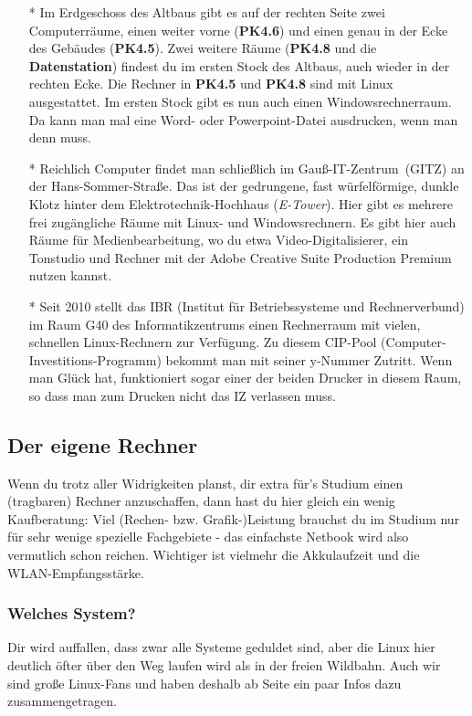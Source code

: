 			\begin{itemize}
				\item[*] Im Erdgeschoss des Altbaus gibt es auf der rechten Seite zwei Computerräume, einen weiter vorne (\textbf{PK4.6}) und einen genau in der Ecke des Gebäudes (\textbf{PK4.5}). Zwei weitere Räume (\textbf{PK4.8} und die \textbf{Datenstation}) findest du im ersten Stock des Altbaus, auch wieder in der rechten Ecke. Die Rechner in \textbf{PK4.5} und \textbf{PK4.8} sind mit Linux ausgestattet. Im ersten Stock gibt es nun auch einen Windowsrechnerraum. Da kann man mal eine Word- oder Powerpoint-Datei ausdrucken, wenn man denn muss.

				\item[*] Reichlich Computer findet man schließlich im Gauß-IT-Zentrum~(GITZ) an der Hans-Sommer-Straße. Das ist der gedrungene, fast würfelförmige, dunkle Klotz hinter dem Elektrotechnik-Hochhaus (\emph{E-Tower}). Hier gibt es mehrere frei zugängliche Räume mit  Linux- und Windowsrechnern. Es gibt hier auch Räume für Medienbearbeitung, wo du etwa Video-Digitalisierer, ein Tonstudio und Rechner mit der Adobe Creative Suite Production Premium nutzen kannst.

				\item[*] Seit 2010 stellt das IBR (Institut für Betriebssysteme und Rechnerverbund) im Raum G40 des Informatikzentrums einen Rechnerraum mit vielen, schnellen Linux-Rechnern  zur Verfügung. Zu diesem CIP-Pool (Computer-Investitions-Programm) bekommt man mit seiner y-Nummer Zutritt. Wenn man Glück hat, funktioniert sogar einer der beiden Drucker in diesem Raum, so dass man zum Drucken nicht das IZ verlassen muss.
			\end{itemize}

		\subsection{Der eigene Rechner}
			Wenn du trotz aller Widrigkeiten planst, dir
			extra für's Studium einen (tragbaren) Rechner
			anzuschaffen, dann hast du hier gleich ein wenig
			Kaufberatung: Viel (Rechen- bzw.
			Grafik-)Leistung brauchst du im Studium  nur für
			sehr wenige spezielle Fachgebiete - das
			einfachste Netbook wird also vermutlich schon
			reichen. Wichtiger ist vielmehr die Akkulaufzeit
			und die WLAN-Empfangsstärke. %

		\subsubsection{Welches System?}
			Dir wird auffallen, dass zwar alle Systeme geduldet sind, aber die Linux hier deutlich öfter über den Weg laufen wird als in der freien Wildbahn. Auch wir sind große Linux-Fans und haben deshalb ab Seite \pageref{linux} ein paar Infos dazu zusammengetragen.

